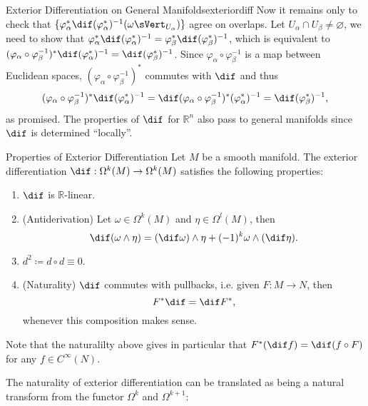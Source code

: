 \documentclass[12pt, a3paper, openany]{book}
\begin{document}
\begin{Remark}{Exterior Differentiation on General Manifolds}{exteriordiff}
Now it remains only to check that $\{ \varphi_\alpha^*\dif(\varphi_\alpha^*)^{-1}(\omega\sVert_{U_\alpha})\}$ agree on overlaps. Let $U_\alpha\cap U_\beta\neq \varnothing$, we need to show that $\varphi_\alpha^*\dif(\varphi_\alpha^*)^{-1}= \varphi_\beta^*\dif(\varphi_\beta^*)^{-1}$, which is equivalent to $ (\varphi_\alpha\circ \varphi_{\beta}^{-1})^*\dif(\varphi_\alpha^*)^{-1}= \dif(\varphi_\beta^*)^{-1} $. Since $ \varphi_\alpha\circ \varphi_{\beta}^{-1}$ is a map between Euclidean spaces, $(\varphi_\alpha\circ \varphi_{\beta}^{-1})^* $ commutes with $\dif$ and thus
\begin{equation}
    (\varphi_\alpha\circ \varphi_{\beta}^{-1})^*\dif(\varphi_\alpha^*)^{-1}=\dif (\varphi_\alpha\circ \varphi_{\beta}^{-1})^*(\varphi_\alpha^*)^{-1}=\dif (\varphi_\beta^*)^{-1},
\end{equation}
as promised. The properties of $\dif$ for $\mathbb{R}^n$ also pass to general manifolds since $\dif$ is determined ``locally''.
\begin{Proposition}{Properties of Exterior Differentiation}{}
Let $M$ be a smooth manifold. The exterior differentiation $\dif:\Omega^k(M)\to\Omega^k(M)$ satisfies the following properties:
\begin{enumerate}[label=(\alph*)]
    \item $\dif$ is $\mathbb{R}$-linear.
    \item (Antiderivation) Let $\omega\in \Omega^k(M)$ and $\eta\in \Omega^l(M)$, then
    \begin{equation*}
        \dif (\omega\wedge\eta)=(\dif\omega)\wedge\eta+(-1)^k\omega\wedge(\dif\eta).
    \end{equation*}
    \item $d^2\coloneqq d\circ d\equiv 0$.
    \item (Naturality) $\dif $ commutes with pullbacks, i.e. given $F:M\to N$, then
    \begin{equation*}
        F^*\dif=\dif F^*,
    \end{equation*}
    whenever this composition makes sense.
\end{enumerate}
\end{Proposition}

Note that the naturalilty above gives in particular that $F^*(\dif f) = \dif (f\circ F)$ for any $f\in C^\infty(N)$.

The naturality of exterior differentiation can be translated as being a natural transform from the functor $\Omega^k$ and $\Omega^{k+1}$:
\begin{center}
\end{center}
\end{Remark}
\end{document}
